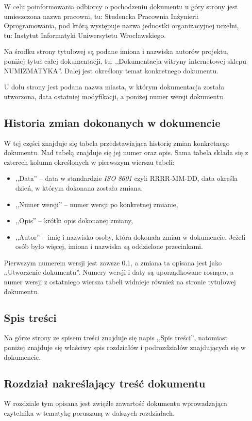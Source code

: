 \documentclass 	[11pt, a4paper, leqno]	{article}					%
\begin{document}
W celu poinformowania odbiorcy o pochodzeniu dokumentu u góry strony jest umieszczona nazwa pracowni, tu: Studencka Pracownia Inżynierii Oprogramowania, pod którą występuje nazwa jednostki organizacyjnej uczelni, tu: Instytut Informatyki Uniwersytetu Wrocławskiego.

Na środku strony tytułowej są podane imiona i nazwiska autorów projektu, poniżej tytuł całej dokumentacji, tu: ,,Dokumentacja witryny internetowej sklepu NUMIZMATYKA''.
Dalej jest określony temat konkretnego dokumentu. 

U dołu strony jest podana nazwa miasta, w którym dokumentacja została utworzona, data ostatniej modyfikacji, a poniżej numer wersji dokumentu.

\subsection{Historia zmian dokonanych w dokumencie}
\noindent
W tej części znajduje się tabela przedstawiająca historię zmian konkretnego dokumentu. Nad tabelą znajduje się jej numer oraz opis. Sama tabela składa się z czterech kolumn określonych w pierwszym wierszu tabeli:
\begin{itemize}
	\item ,,Data'' -- data w standardzie \textit{ISO 8601} czyli RRRR-MM-DD, data określa dzień, w którym dokonana została zmiana,
	\item ,,Numer wersji'' -- numer wersji po konkretnej zmianie,
	\item ,,Opis'' -- krótki opis dokonanej zmiany,
	\item ,,Autor'' -- imię i nazwisko osoby, która dokonała zmian w dokumencie. Jeżeli osób było więcej, imiona i nazwiska są oddzielone przecinkami.
\end{itemize}

Pierwszym numerem wersji jest zawsze 0.1, a zmiana ta opisana jest jako ,,Utworzenie dokumentu''. Numery wersji i daty są uporządkowane rosnąco, a numer wersji z ostatniego wiersza tabeli widnieje również na stronie tytułowej dokumentu.

\subsection{Spis treści}
\noindent
Na górze strony ze spisem treści znajduje się napis ,,Spis treści'', natomiast poniżej znajduje się właściwy spis rozdziałów i podrozdziałów znajdujących się w dokumencie. 

\subsection{Rozdział nakreślający treść dokumentu}
\noindent
W rozdziale tym opisana jest zwięźle zawartość dokumentu wprowadzająca czytelnika w tematykę poruszaną w dalszych rozdziałach.
\end{document}
